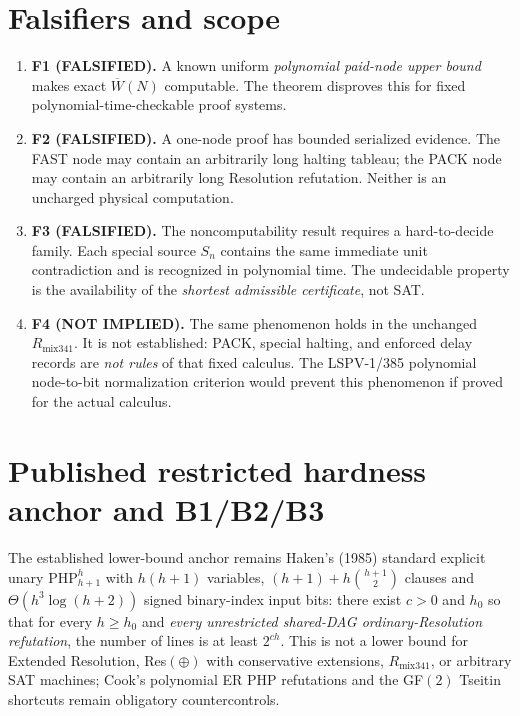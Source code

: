 \documentclass[11pt]{article}
\begin{document}
\section*{Falsifiers and scope}
\begin{enumerate}
\item[] \textbf{F1 (FALSIFIED).} A known uniform \emph{polynomial paid-node upper bound} makes exact $\overline W(N)$ computable. The theorem disproves this for fixed polynomial-time-checkable proof systems.
\item[] \textbf{F2 (FALSIFIED).} A one-node proof has bounded serialized evidence. The FAST node may contain an arbitrarily long halting tableau; the PACK node may contain an arbitrarily long Resolution refutation. Neither is an uncharged physical computation.
\item[] \textbf{F3 (FALSIFIED).} The noncomputability result requires a hard-to-decide family. Each special source $S_n$ contains the same immediate unit contradiction and is recognized in polynomial time. The undecidable property is the availability of the \emph{shortest admissible certificate}, not SAT.
\item[] \textbf{F4 (NOT IMPLIED).} The same phenomenon holds in the unchanged $R_{\mathrm{mix341}}$. It is not established: PACK, special halting, and enforced delay records are \emph{not rules} of that fixed calculus. The LSPV-1/385 polynomial node-to-bit normalization criterion would prevent this phenomenon if proved for the actual calculus.
\end{enumerate}

\section*{Published restricted hardness anchor and B1/B2/B3}
The established lower-bound anchor remains Haken's (1985) standard explicit unary $\mathrm{PHP}_{h+1}^h$ with $h(h+1)$ variables, $(h+1)+h\binom{h+1}{2}$ clauses and $\Theta(h^3\log(h+2))$ signed binary-index input bits: there exist $c>0$ and $h_0$ so that for every $h\ge h_0$ and \emph{every unrestricted shared-DAG ordinary-Resolution refutation}, the number of lines is at least $2^{ch}$. This is not a lower bound for Extended Resolution, Res$(\oplus)$ with conservative extensions, $R_{\mathrm{mix341}}$, or arbitrary SAT machines; Cook's polynomial ER PHP refutations and the GF$(2)$ Tseitin shortcuts remain obligatory countercontrols.
\end{document}
